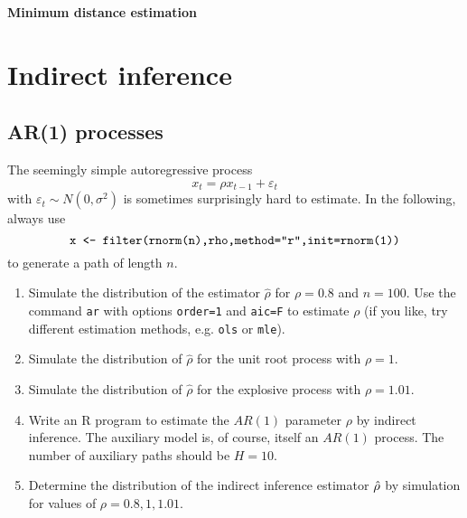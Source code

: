 \documentclass{article}
\begin{document}
\begin{solution}
\textbf{Minimum distance estimation}
\end{solution}

\newpage
\section{Indirect inference}

\subsection{AR(1) processes}

The seemingly simple autoregressive process%
\begin{equation*}
x_{t}=\rho x_{t-1}+\varepsilon _{t}
\end{equation*}%
with $\varepsilon _{t}\sim N(0,\sigma ^{2})$ is sometimes surprisingly hard
to estimate. In the following, always use%
\begin{equation*}
\text{\texttt{x\ <-\
filter(rnorm(n),rho,method="r",init=rnorm(1))}}
\end{equation*}%
to generate a path of length $n$.

\begin{enumerate}
\item Simulate the distribution of the estimator $\hat{\rho}$ for $\rho =0.8$
and $n=100$. Use the command \texttt{ar} with options \texttt{order=1} and
\texttt{aic=F} to estimate $\rho $ (if you like, try different estimation
methods, e.g. \texttt{ols} or \texttt{mle}).

\item Simulate the distribution of $\hat{\rho}$ for the unit root process
with $\rho =1$.

\item Simulate the distribution of $\hat{\rho}$ for the explosive process
with $\rho =1.01$.

\item Write an R program to estimate the $AR(1)$ parameter $\rho $ by
indirect inference. The auxiliary model is, of course, itself an $AR(1)$
process. The number of auxiliary paths should be $H=10$.

\item Determine the distribution of the indirect inference estimator $\hat{%
\rho}$ by simulation for values of $\rho =0.8,1,1.01$.
\end{enumerate}
\end{document}

